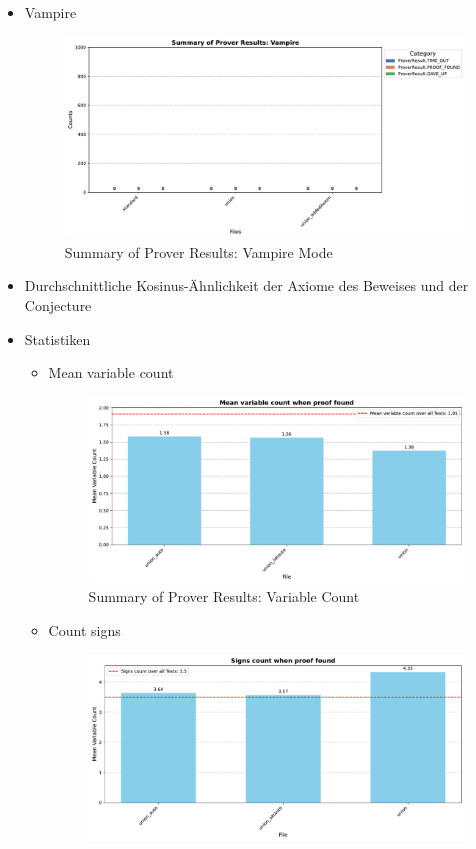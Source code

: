 \documentclass[german,version-2020-11]{uzl-thesis}
\begin{document}
\begin{itemize}
    \clearpage
    \item Vampire
    \begin{figure}[h!]
      \centering
      \includegraphics[width=\textwidth]{vampire_mode_output.pdf} %
      \caption{Summary of Prover Results: Vampire Mode}
      \label{fig:prover_results_vampire}
    \end{figure}
    \clearpage
    \item Durchschnittliche Kosinus-Ähnlichkeit der Axiome des Beweises und der Conjecture
    \item Statistiken
      \begin{itemize}
        \item Mean variable count
        \begin{figure}[h!]
          \centering
          \includegraphics[width=\textwidth]{variable_count.pdf} %
          \caption{Summary of Prover Results: Variable Count}
          \label{fig:prover_results_vampire}
        \end{figure}
        \clearpage
        \item Count signs
        \begin{figure}[h!]
          \centering
          \includegraphics[width=\textwidth]{signs_count.pdf} %

\end{figure}
\end{itemize}
\end{itemize}
\end{document}
